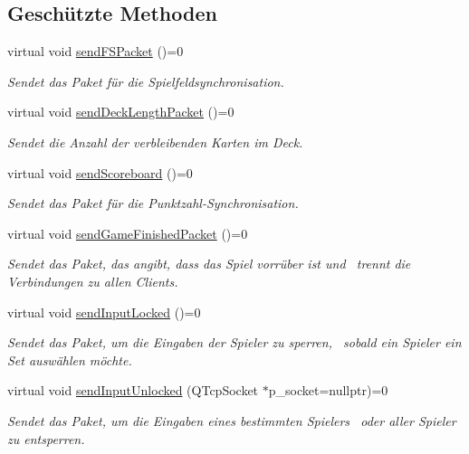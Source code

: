 \subsection*{Geschützte Methoden}
\begin{DoxyCompactItemize}
\item 
virtual void \hyperlink{class_server_a19626d482d7017eddc08d7108ea46172}{send\+F\+S\+Packet} ()=0
\begin{DoxyCompactList}\small\item\em Sendet das Paket für die Spielfeldsynchronisation. \end{DoxyCompactList}\item 
virtual void \hyperlink{class_server_af5674e040ed1c7265d1661d009a5c8c8}{send\+Deck\+Length\+Packet} ()=0
\begin{DoxyCompactList}\small\item\em Sendet die Anzahl der verbleibenden Karten im Deck. \end{DoxyCompactList}\item 
virtual void \hyperlink{class_server_a3f98e42962d5962f968ac4b8fd9e1319}{send\+Scoreboard} ()=0
\begin{DoxyCompactList}\small\item\em Sendet das Paket für die Punktzahl-\/\+Synchronisation. \end{DoxyCompactList}\item 
virtual void \hyperlink{class_server_a668f044471c3d90b0478f66aeceae97a}{send\+Game\+Finished\+Packet} ()=0
\begin{DoxyCompactList}\small\item\em Sendet das Paket, das angibt, dass das Spiel vorrüber ist und~\newline
 trennt die Verbindungen zu allen Clients. \end{DoxyCompactList}\item 
virtual void \hyperlink{class_server_a45454ed604157da02e8091b70de8faee}{send\+Input\+Locked} ()=0
\begin{DoxyCompactList}\small\item\em Sendet das Paket, um die Eingaben der Spieler zu sperren,~\newline
 sobald ein Spieler ein Set auswählen möchte. \end{DoxyCompactList}\item 
virtual void \hyperlink{class_server_a04ade032f7222f003ecfec4a488ca546}{send\+Input\+Unlocked} (Q\+Tcp\+Socket $\ast$p\+\_\+socket=nullptr)=0
\begin{DoxyCompactList}\small\item\em Sendet das Paket, um die Eingaben eines bestimmten Spielers~\newline
 oder aller Spieler zu entsperren. \end{DoxyCompactList}\end{DoxyCompactItemize}
